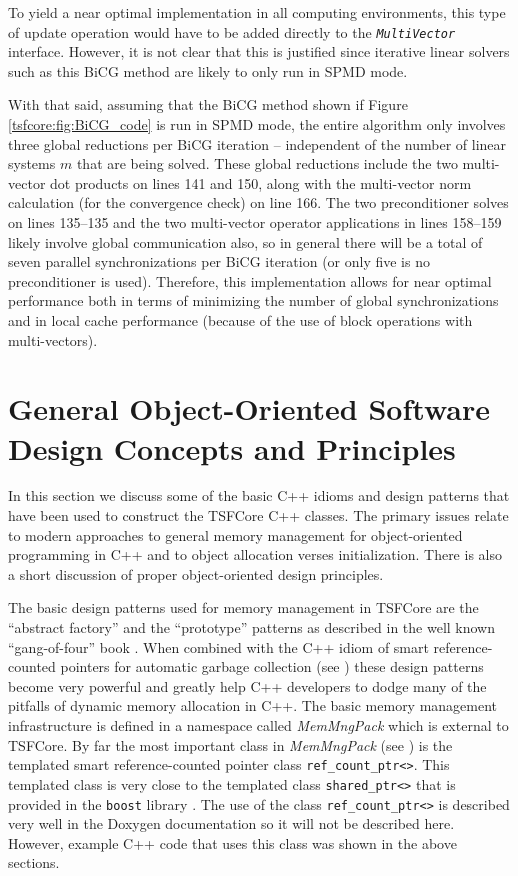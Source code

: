 \documentclass[10pt,fleqn]{article}
\begin{document}
To yield a near optimal implementation in all computing environments,
this type of update operation would have to be added directly to the
\texttt{\textit{MultiVector}} interface.  However, it is not clear
that this is justified since iterative linear solvers such as this
BiCG method are likely to only run in SPMD mode.

With that said, assuming that the BiCG method shown if Figure
\ref{tsfcore:fig:BiCG_code} is run in SPMD mode, the entire
algorithm only involves three global reductions per BiCG iteration --
independent of the number of linear systems $m$ that are being solved.
These global reductions include the two multi-vector dot products on
lines 141 and 150, along with the multi-vector norm calculation (for
the convergence check) on line 166.  The two preconditioner solves on
lines 135--135 and the two multi-vector operator applications in lines
158--159 likely involve global communication also, so in general there
will be a total of seven parallel synchronizations per BiCG iteration
(or only five is no preconditioner is used).  Therefore, this
implementation allows for near optimal performance both in terms of
minimizing the number of global synchronizations and in local cache
performance (because of the use of block operations with
multi-vectors).

%
\section{General Object-Oriented Software Design Concepts and Principles}
\label{tsfcore:sec:general_software_concepts}
%
 
In this section we discuss some of the basic C++ idioms and design
patterns that have been used to construct the TSFCore C++ classes.  The
primary issues relate to modern approaches to general memory
management for object-oriented programming in C++ and to object
allocation verses initialization.  There is also a short discussion of
proper object-oriented design principles.

The basic design patterns used for memory management in TSFCore are the
``abstract factory'' and the ``prototype'' patterns as described in
the well known ``gang-of-four'' book \cite{ref:gama_et_al_1995}.  When
combined with the C++ idiom of smart reference-counted pointers for
automatic garbage collection (see \cite[Items 28-29]{ref:meyers_1996})
these design patterns become very powerful and greatly help C++
developers to dodge many of the pitfalls of dynamic memory allocation
in C++.  The basic memory management infrastructure is defined in a
namespace called \textit{MemMngPack} which is external to TSFCore.  By
far the most important class in \textit{MemMngPack} (see
\cite{ref:moochodevguide}) is the templated smart reference-counted pointer class
\texttt{ref\_count\_ptr<>}.  This templated class is very close to the
templated class \texttt{shared\_ptr<>} that is provided in the
\texttt{boost} library \cite{ref:boost}.  The use of the class
\texttt{ref\_count\_ptr<>} is described very well in the Doxygen
documentation so it will not be described here.  However, example C++
code that uses this class was shown in the above sections.
\end{document}
